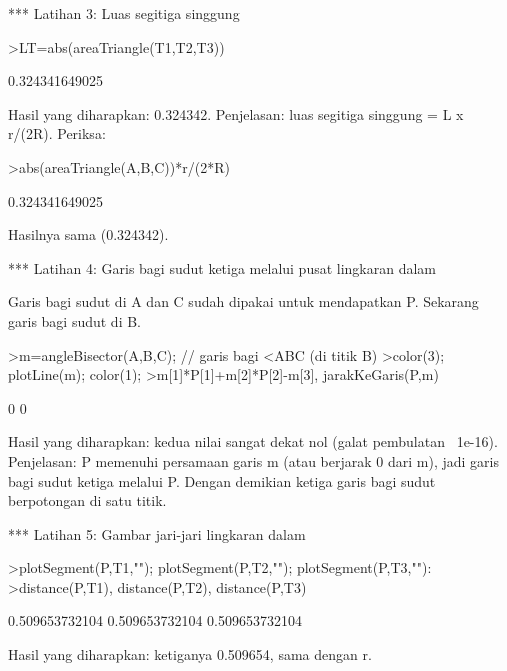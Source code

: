 \documentclass[a4paper,10pt]{article}
\begin{document}
\begin{eulernotebook}
\begin{eulercomment}
\begin{eulercomment}
\begin{eulercomment}
\begin{eulercomment}
\begin{eulercomment}
*** Latihan 3: Luas segitiga singgung
\end{eulercomment}
\begin{eulerprompt}
>LT=abs(areaTriangle(T1,T2,T3))
\end{eulerprompt}
\begin{euleroutput}
  0.324341649025
\end{euleroutput}
\begin{eulercomment}
Hasil yang diharapkan: 0.324342.
Penjelasan: luas segitiga singgung = L x r/(2R). Periksa:
\end{eulercomment}
\begin{eulerprompt}
>abs(areaTriangle(A,B,C))*r/(2*R)
\end{eulerprompt}
\begin{euleroutput}
  0.324341649025
\end{euleroutput}
\begin{eulercomment}
Hasilnya sama (0.324342).

*** Latihan 4: Garis bagi sudut ketiga melalui pusat lingkaran dalam

Garis bagi sudut di A dan C sudah dipakai untuk mendapatkan P. Sekarang garis bagi sudut di B.
\end{eulercomment}
\begin{eulerprompt}
>m=angleBisector(A,B,C); // garis bagi <ABC (di titik B)
>color(3); plotLine(m); color(1);
>m[1]*P[1]+m[2]*P[2]-m[3], jarakKeGaris(P,m)
\end{eulerprompt}
\begin{euleroutput}
  0
  0
\end{euleroutput}
\begin{eulercomment}
Hasil yang diharapkan: kedua nilai sangat dekat nol (galat pembulatan ~1e-16).
Penjelasan: P memenuhi persamaan garis m (atau berjarak 0 dari m), jadi garis bagi sudut ketiga
melalui P. Dengan demikian ketiga garis bagi sudut berpotongan di satu titik.

*** Latihan 5: Gambar jari-jari lingkaran dalam
\end{eulercomment}
\begin{eulerprompt}
>plotSegment(P,T1,""); plotSegment(P,T2,""); plotSegment(P,T3,""):
>distance(P,T1), distance(P,T2), distance(P,T3)
\end{eulerprompt}
\begin{euleroutput}
  0.509653732104
  0.509653732104
  0.509653732104
\end{euleroutput}
\begin{eulercomment}
Hasil yang diharapkan: ketiganya 0.509654, sama dengan r.


\end{eulercomment}
\end{eulercomment}
\end{eulercomment}
\end{eulercomment}
\end{eulercomment}
\end{eulernotebook}
\end{document}
